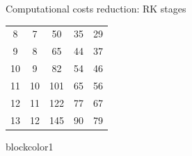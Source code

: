 \documentclass[9pt,compress,t,aspectratio=169]{beamer}
\begin{document}
\begin{frame}{Computational costs reduction: RK stages}
\begin{minipage}{0.49\textwidth}
{\begin{tabular}{|c|c||c|c|c|}
				8  &     7  &   50 &  35  &   29 \\ 
				9  &     8  &   65 &  44  &   37 \\ 
				10  &     9  &  82 &  54  &   46 \\ 
				11  &    10  &  101 &  65  &  56 \\ 
				12  &    11  &  122 &  77  &  67 \\ 
				13  &    12  &  145 &  90  &  79 \\\hline		
			\end{tabular}
		}
		\end{minipage}	
		\hfill
		\begin{minipage}{0.49\textwidth}
		\centering
	\begin{beamercolorbox}[sep=1em,wd=\textwidth]{blockcolor1}
		\begin{center}
			\LARGE 
		\end{center}
	\end{beamercolorbox}
\end{minipage}
\end{frame}
\end{document}
